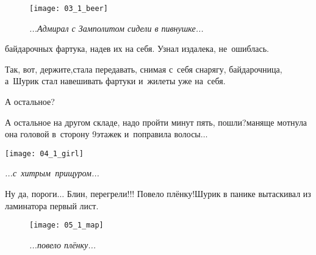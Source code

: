 \begin{figure}[h]
	\centering
	\texttt{[image: 03\_1\_beer]}
	\caption{\small\textit{...Адмирал с Замполитом сидели в пивнушке...}}
\end{figure}

\newpage

\noindent
\begin{minipage}{0.55\textwidth}
	\setlength{\parindent}{1.0cm}  %
	\setlength{\parskip}{0.25cm}     %
	
	\noindent байдарочных фартука, надев их на себя. Узнал издалека, не~ошиблась.
	
	\diagdash Так, вот, держите,\mdash стала передавать, снимая с~себя снарягу, байдарочница, а~Шурик стал навешивать фартуки и~жилеты уже на~себя.
	
	\diagdash А остальное?	
	
	\diagdash А остальное на другом складе, надо пройти минут пять, пошли?\mdash маняще мотнула она головой в~сторону 9\sdash этажек и~поправила волосы$\ldots$
\end{minipage}\hfill
\begin{minipage}{0.40\textwidth}
	\centering
	\texttt{[image: 04\_1\_girl]}
	
	{\small\textit{...с~хитрым~прищуром...}}
\end{minipage}

\newpage

%
%
%

\diagdash Ну да, пороги$\ldots$ Блин, перегрели!!! Повело плёнку!\mdash Шурик в панике вытаскивал из ламинатора первый лист.\begin{wrapfigure}[11]{l}{0.49\textwidth}
	\centering	
	\texttt{[image: 05\_1\_map]}
	\caption{\small\textit{...повело плёнку...}}
\end{wrapfigure}

